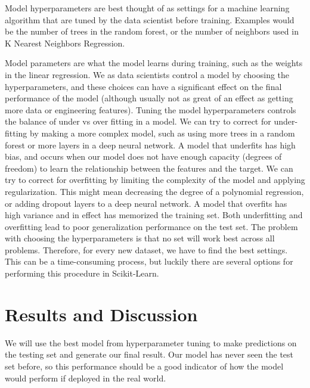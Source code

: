 \documentclass{article}
\begin{document}
Model hyperparameters are best thought of as settings for a machine learning algorithm that are tuned by the data scientist before training. Examples would be the number of trees in the random forest, or the number of neighbors used in K Nearest Neighbors Regression.

Model parameters are what the model learns during training, such as the weights in the linear regression. We as data scientists control a model by choosing the hyperparameters, and these choices can have a significant effect on the final performance of the model (although usually not as great of an effect as getting more data or engineering features). Tuning the model hyperparameters controls the balance of under vs over fitting in a model. We can try to correct for under-fitting by making a more complex model, such as using more trees in a random forest or more layers in a deep neural network. A model that underfits has high bias, and occurs when our model does not have enough capacity (degrees of freedom) to learn the relationship between the features and the target. We can try to correct for overfitting by limiting the complexity of the model and applying regularization. This might mean decreasing the degree of a polynomial regression, or adding dropout layers to a deep neural network. A model that overfits has high variance and in effect has memorized the training set. Both underfitting and overfitting lead to poor generalization performance on the test set.
The problem with choosing the hyperparameters is that no set will work best across all problems. Therefore, for every new dataset, we have to find the best settings. This can be a time-consuming process, but luckily there are several options for performing this procedure in Scikit-Learn.


\section*{Results and Discussion}
We will use the best model from hyperparameter tuning to make predictions on the testing set and generate our final result. Our model has never seen the test set before, so this performance should be a good indicator of how the model would perform if deployed in the real world.
\end{document}
